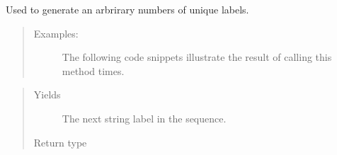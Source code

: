 \documentclass[letterpaper,10pt,english]{sphinxmanual}
\begin{document}
\begin{fulllineitems}
\label{\detokenize{app:app.simfile_generator.yield_label}}
Used to generate an arbrirary numbers of unique labels.
\begin{quote}
\begin{description}
\item[{Examples:}] \leavevmode
The following code snippets illustrate the result of calling this
method  times.

\begin{sphinxVerbatim}[commandchars=\\\{\}]
    
      
       
 \PYG{p}{[}   \PYG{p}{]}

     
      
       
 \PYG{p}{[}        \PYG{p}{]}
\end{sphinxVerbatim}

\end{description}
\end{quote}
\begin{quote}\begin{description}
\item[{Yields}] \leavevmode
The next string label in the sequence.

\item[{Return type}] \leavevmode
{}

\end{description}\end{quote}

\end{fulllineitems}
\end{document}
